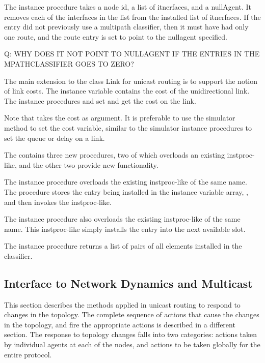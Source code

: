 \begin{list}{---}{}
The instance procedure 
takes a node id, a list of itnerfaces, and a nullAgent.
It removes each of the interfaces in the list from the installed list of
itnerfaces.
If the entry did not previously use a multipath classifier,
then it must have had only one route, and the route entry is set to point
to the nullagent specified.

Q:  WHY DOES IT NOT POINT TO NULLAGENT IF THE ENTRIES IN THE MPATHCLASSIFIER
GOES TO ZERO?

\item   %
  The main extension to the class Link for unicast routing is
  to support the notion of link costs.
  The instance variable 
  contains the cost of the unidirectional link.
  The instance procedures
  and
  set and get the cost on the link.

  Note that  takes the cost as argument.
  It is preferable to use the simulator method to set the cost variable,
  similar to the simulator instance procedures to set the queue or delay
  on a link.
  
\item   %
The 
contains three new procedures, two of which overloads an existing
instproc-like, and the other two provide new functionality.

The instance procedure 
overloads the existing instproc-like of the same name.
The procedure stores the entry being installed in the instance
variable array, , and then invokes the instproc-like.

The instance procedure 
also overloads the existing instproc-like of the same name.
This instproc-like simply installs the entry into the next available slot.

The instance procedure 
returns a list of  pairs of all elements installed in the
classifier.
\end{list}

\subsection{Interface to Network Dynamics and Multicast}
\label{sec:rtglibAPI}
This section describes the methods applied in unicast routing to respond
to changes in the topology.
The complete sequence of actions that cause the changes in the topology,
and fire the appropriate actions is described in a different section.
The response to topology changes falls into two categories:
actions taken by individual agents at each of the nodes, and
actions to be taken globally for the entire protocol.

